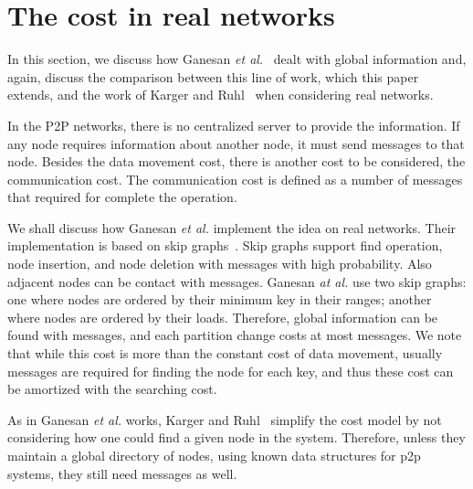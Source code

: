 \documentclass[a4paper]{article}
\begin{document}
\section{The cost in real networks}
\label{sect:p2p}

In this section, we discuss how Ganesan {\em et
  al.}~\cite{GanesanBGM04-vldb} dealt with  global information and,
again, discuss the comparison between this line of work, which this
paper extends, and the work of Karger and
Ruhl~\cite{Karger03newalgorithms, Karger04simpleefficient} when
considering real networks.

In the P2P networks, there is no centralized server to
provide the information.  If any node requires information about another
node, it must send  messages to that node.  Besides the data
movement cost, there is another cost to be considered, the
communication cost.  The communication cost is defined as a number
of messages that required for complete the operation.

We shall discuss how Ganesan {\em et al.} implement the idea on real
networks.  Their implementation is based on skip
graphs~\cite{Aspnes-SODA03}.  Skip graphs support find operation,
node insertion, and node deletion with  messages with high
probability.  Also adjacent nodes can be contact with  messages.
Ganesan {\em at al.}  use two skip graphs: one where nodes are
ordered by their minimum key in their ranges; another where nodes are
ordered by their loads.  Therefore, global information can be found
with  messages, and each partition change costs at most
 messages.  We note that while this cost is more than the
constant cost of data movement, usually  messages are
required for finding the node for each key, and thus these cost can be
amortized with the searching cost.

As in Ganesan {\em et al.} works, Karger and
Ruhl~\cite{Karger03newalgorithms, Karger04simpleefficient} simplify
the cost model by not considering how one could find a given node in
the system.  Therefore, unless they maintain a global directory of
nodes, using known data structures for p2p systems, they still need
 messages as well.


\end{document}
